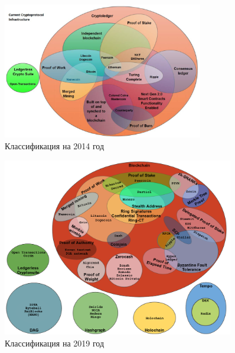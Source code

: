 \begin{figure}[h!]
    \centering
    \includegraphics[width=0.78\textwidth]{./images/current_protocols}
    \caption{Классификация на 2014 год \cite{TimSwanson2014}}\label{2014protocol}
\end{figure}


\begin{figure}[h!]
    \centering
    \includegraphics[width=0.9\textwidth]{./images/myprotocol}
    \caption{Классификация на 2019 год}\label{myprotocol}
\end{figure}
